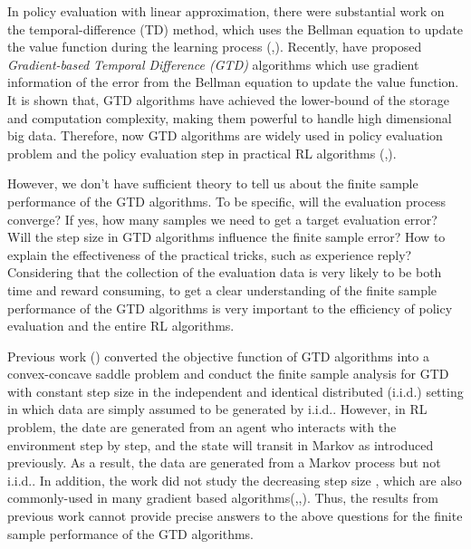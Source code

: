 \documentclass[twoside,11pt]{article}
\numberwithin{equation}{section}
\begin{document}
	In policy evaluation with linear approximation, there were substantial work on the temporal-difference (TD) method, which uses the Bellman equation to update the value function during the learning process (\cite{sutton1988learning},\cite{tsitsiklis1997analysis}). Recently, \cite{sutton2009convergent} \cite{sutton2009fast} have proposed \emph{Gradient-based Temporal Difference (GTD)} algorithms which use gradient information of the error from the Bellman equation to update the value function.  It is shown that, GTD algorithms have achieved the lower-bound of the storage and computation complexity, making them powerful to handle high dimensional big data.  Therefore, now GTD algorithms are widely used in policy evaluation problem and the policy evaluation step in practical RL algorithms (\cite{bhatnagar2009convergent},\cite{silver2014deterministic}).  %
	
	
	However, we don’t have sufficient theory to tell us about the finite sample performance of the GTD algorithms. To be specific, will the evaluation process converge? If yes, how many samples we need to get a target evaluation error? Will the step size in GTD algorithms influence the finite sample error? How to explain the effectiveness of the practical tricks, such as experience reply? Considering that the collection of the evaluation data is very likely to be both time and reward consuming, to get a clear understanding of the finite sample performance of the GTD algorithms is very important to the efficiency of policy evaluation and the entire RL algorithms.
	
	Previous work (\cite{liu2015finite}) converted the objective function of GTD algorithms into a convex-concave saddle problem and conduct the finite sample analysis for GTD with constant step size in the independent and identical distributed (i.i.d.) setting in which data are simply assumed to be generated by  i.i.d.. However, in RL problem, the date are generated from an agent who interacts with the environment step by step, and the state will transit in Markov as introduced previously. As a result, the data are generated from a Markov process but not i.i.d..  In addition, the work did not study the decreasing step size , which are also commonly-used  in many gradient based algorithms(\cite{sutton2009convergent},\cite{sutton2009fast},\cite{yu2015convergence}). Thus, the results from previous work cannot provide precise answers to the above questions for the finite sample performance of the GTD algorithms.
	
\end{document}
